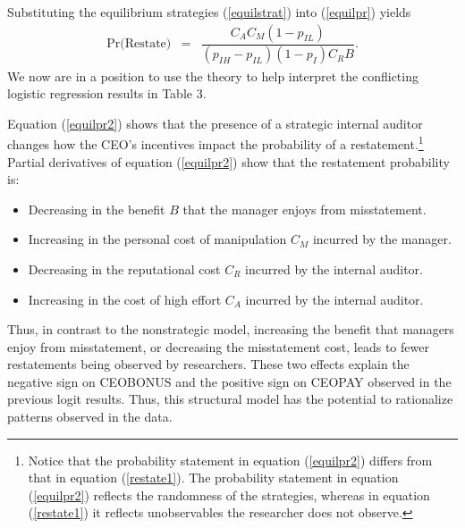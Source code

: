 \documentclass[14pt]{article}
\begin{document}
Substituting the equilibrium strategies (\ref{equilstrat}) into (\ref{equilpr}) yields
\begin{equation} \label{equilpr2}
\begin{array}{lcl}
\mbox{Pr(Restate)}& = &  \dfrac{C_AC_M(1-p_{IL})}{(p_{IH}-p_{IL})(1-p_I)C_RB}.
\end{array}\end{equation}
We now are in a position to use the theory to help interpret the conflicting logistic regression results
in Table 3. 

 
Equation (\ref{equilpr2}) shows that the presence of a strategic internal auditor
changes how the CEO's incentives impact the probability of a restatement.\footnote{Notice that
the probability statement in equation  (\ref{equilpr2})  differs from that in equation (\ref{restate1}).
The probability statement in equation  (\ref{equilpr2}) reflects the randomness of the
strategies, whereas in equation (\ref{restate1}) it reflects unobservables the researcher 
does not observe.} Partial derivatives of equation (\ref{equilpr2}) show that the restatement probability is:\\

\begin{itemize}
\item Decreasing in the benefit $B$ that the manager enjoys from misstatement.
\item Increasing in the personal cost of manipulation $C_M$ incurred by the manager.
\item Decreasing in the reputational cost $C_R$ incurred by the internal auditor.
\item Increasing in the cost of high effort $C_A$ incurred by the internal auditor.\\
\end{itemize}

Thus, in contrast to the nonstrategic model, increasing the benefit that managers enjoy from misstatement,
or decreasing the misstatement cost, leads to fewer restatements being observed by researchers.
These two effects explain the negative sign on CEOBONUS and the positive sign on CEOPAY observed in the previous logit results. Thus, this structural model has the potential to rationalize patterns observed in the data.
\end{document}
